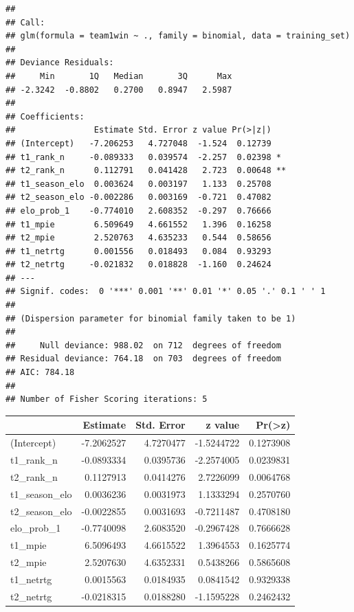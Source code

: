 \documentclass[]{article}
\newenvironment{Shaded}{\begin{snugshade}}{\end{snugshade}}
\newcommand{\KeywordTok}[1]{\textcolor[rgb]{0.13,0.29,0.53}{\textbf{#1}}}
\newcommand{\OperatorTok}[1]{\textcolor[rgb]{0.81,0.36,0.00}{\textbf{#1}}}
\newcommand{\NormalTok}[1]{#1}
\begin{document}
\begin{verbatim}
## 
## Call:
## glm(formula = team1win ~ ., family = binomial, data = training_set)
## 
## Deviance Residuals: 
##     Min       1Q   Median       3Q      Max  
## -2.3242  -0.8802   0.2700   0.8947   2.5987  
## 
## Coefficients:
##                Estimate Std. Error z value Pr(>|z|)   
## (Intercept)   -7.206253   4.727048  -1.524  0.12739   
## t1_rank_n     -0.089333   0.039574  -2.257  0.02398 * 
## t2_rank_n      0.112791   0.041428   2.723  0.00648 **
## t1_season_elo  0.003624   0.003197   1.133  0.25708   
## t2_season_elo -0.002286   0.003169  -0.721  0.47082   
## elo_prob_1    -0.774010   2.608352  -0.297  0.76666   
## t1_mpie        6.509649   4.661552   1.396  0.16258   
## t2_mpie        2.520763   4.635233   0.544  0.58656   
## t1_netrtg      0.001556   0.018493   0.084  0.93293   
## t2_netrtg     -0.021832   0.018828  -1.160  0.24624   
## ---
## Signif. codes:  0 '***' 0.001 '**' 0.01 '*' 0.05 '.' 0.1 ' ' 1
## 
## (Dispersion parameter for binomial family taken to be 1)
## 
##     Null deviance: 988.02  on 712  degrees of freedom
## Residual deviance: 764.18  on 703  degrees of freedom
## AIC: 784.18
## 
## Number of Fisher Scoring iterations: 5
\end{verbatim}

\begin{Shaded}
\end{Shaded}

\begin{longtable}[]{@{}lrrrr@{}}
\toprule
& Estimate & Std. Error & z value &
Pr(\textgreater{}\textbar{}z\textbar{})\tabularnewline
\midrule
\endhead
(Intercept) & -7.2062527 & 4.7270477 & -1.5244722 &
0.1273908\tabularnewline
t1\_rank\_n & -0.0893334 & 0.0395736 & -2.2574005 &
0.0239831\tabularnewline
t2\_rank\_n & 0.1127913 & 0.0414276 & 2.7226099 &
0.0064768\tabularnewline
t1\_season\_elo & 0.0036236 & 0.0031973 & 1.1333294 &
0.2570760\tabularnewline
t2\_season\_elo & -0.0022855 & 0.0031693 & -0.7211487 &
0.4708180\tabularnewline
elo\_prob\_1 & -0.7740098 & 2.6083520 & -0.2967428 &
0.7666628\tabularnewline
t1\_mpie & 6.5096493 & 4.6615522 & 1.3964553 & 0.1625774\tabularnewline
t2\_mpie & 2.5207630 & 4.6352331 & 0.5438266 & 0.5865608\tabularnewline
t1\_netrtg & 0.0015563 & 0.0184935 & 0.0841542 &
0.9329338\tabularnewline
t2\_netrtg & -0.0218315 & 0.0188280 & -1.1595228 &
0.2462432\tabularnewline
\bottomrule
\end{longtable}
\end{document}
